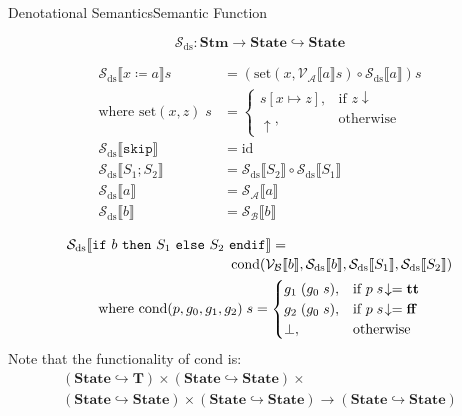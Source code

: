 \documentclass{beamer}
\newcommand{\Stm}{\textbf{Stm}}
\newcommand{\State}{\textbf{State}}
\newcommand{\T}{\textbf{T}}
\newcommand{\sskip}{\texttt{skip}}
\newcommand{\ifelse}[3]{\mathtt{if}\ #1\ \mathtt{then}\ #2\ \mathtt{else}\ #3\ \mathtt{endif}}
\newcommand{\sem}[2]{\mathcal{#1} \llbracket #2 \rrbracket}
\newcommand{\tr}{\mathbf{tt}}
\newcommand{\ff}{\mathbf{ff}}
\newcommand{\undefined}{\uparrow}
\newcommand{\defined}{\!\downarrow}
\begin{document}
\begin{frame}{Denotational Semantics}{Semantic Function}

    $$\mathcal{S}_{\mathrm{ds}}: \Stm \to \State \hookrightarrow \State$$
    \begin{overprint}
        \begin{align*}
            \sem{S_{\mathrm{ds}}}{x \coloneq a}s & =
            (\mathrm{set}(x, \sem{V_A}{a}s) \circ \sem{S_\mathrm{ds}}{a})s \\
            \mbox{where } \mathrm{set}(x, z)\;s  & =
            \begin{cases}
                s[x \mapsto z], & \mbox{if } z\defined \\
                \undefined,     & \mbox{otherwise}
            \end{cases}                         \\
            \sem{S_{\mathrm{ds}}}{\sskip}        & =
            \mathrm{id}                                                    \\
            \sem{S_{\mathrm{ds}}}{S_1; S_2}      & =
            \sem{S_{\mathrm{ds}}}{S_2} \circ \sem{S_{\mathrm{ds}}}{S_1}    \\
            \sem{S_{\mathrm{ds}}}{a}             & =
            \sem{S_A}{a}                                                   \\
            \sem{S_{\mathrm{ds}}}{b}             & =
            \sem{S_B}{b}
        \end{align*}

        \begin{gather*}
            \begin{multlined}[][0.8\textwidth]
                \sem{S_{\mathrm{ds}}}{\ifelse{b}{S_1}{S_2}} = \\
                \mathrm{cond}(\sem{V_B}{b}, \sem{S_\mathrm{ds}}{b}, \sem{S_{\mathrm{ds}}}{S_1}, \sem{S_{\mathrm{ds}}}{S_2})
            \end{multlined} \\
            \mbox{where } \mathrm{cond}(p, g_0, g_1, g_2)\;s =
            \begin{cases}
                g_1\;(g_0\;s), & \mbox{if } p\;s\defined = \tr \\
                g_2\;(g_0\;s), & \mbox{if } p\;s\defined = \ff \\
                \bot,          & \mbox{otherwise}
            \end{cases}
        \end{gather*}
        Note that the functionality of $\mathrm{cond}$ is:
        \begin{multline*}
            (\State \hookrightarrow \T) \times (\State \hookrightarrow \State) \times \\
            (\State \hookrightarrow \State) \times (\State \hookrightarrow \State) \to (\State \hookrightarrow \State)
        \end{multline*}


\end{overprint}
\end{frame}
\end{document}

